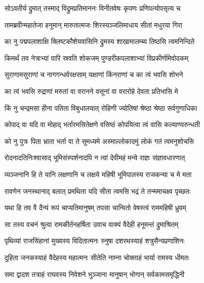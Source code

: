 
\twolineshloka
{सोऽवतीर्य द्रुमात् तस्माद् विद्रुमप्रतिमाननः}
{विनीतवेषः कृपणः प्रणिपत्योपसृत्य च} %

\twolineshloka
{तामब्रवीन्महातेजा हनूमान् मारुतात्मजः}
{शिरस्यञ्जलिमाधाय सीतां मधुरया गिरा} %

\twolineshloka
{का नु पद्मपलाशाक्षि क्लिष्टकौशेयवासिनि}
{द्रुमस्य शाखामालम्ब्य तिष्ठसि त्वमनिन्दिते} %

\twolineshloka
{किमर्थं तव नेत्राभ्यां वारि स्रवति शोकजम्}
{पुण्डरीकपलाशाभ्यां विप्रकीर्णमिवोदकम्} %

\twolineshloka
{सुराणामसुराणां च नागगन्धर्वरक्षसाम्}
{यक्षाणां किंनराणां च का त्वं भवसि शोभने} %

\twolineshloka
{का त्वं भवसि रुद्राणां मरुतां वा वरानने}
{वसूनां वा वरारोहे देवता प्रतिभासि मे} %

\twolineshloka
{किं नु चन्द्रमसा हीना पतिता विबुधालयात्}
{रोहिणी ज्योतिषां श्रेष्ठा श्रेष्ठा सर्वगुणाधिका} %

\twolineshloka
{कोपाद् वा यदि वा मोहाद् भर्तारमसितेक्षणे}
{वसिष्ठं कोपयित्वा त्वं वासि कल्याण्यरुन्धती} %

\twolineshloka
{को नु पुत्रः पिता भ्राता भर्ता वा ते सुमध्यमे}
{अस्माल्लोकादमुं लोकं गतं त्वमनुशोचसि} %

\twolineshloka
{रोदनादतिनिःश्वासाद् भूमिसंस्पर्शनादपि}
{न त्वां देवीमहं मन्ये राज्ञः संज्ञावधारणात्} %

\twolineshloka
{व्यञ्जनानि हि ते यानि लक्षणानि च लक्षये}
{महिषी भूमिपालस्य राजकन्या च मे मता} %

\twolineshloka
{रावणेन जनस्थानाद् बलात् प्रमथिता यदि}
{सीता त्वमसि भद्रं ते तन्ममाचक्ष्व पृच्छतः} %

\twolineshloka
{यथा हि तव वै दैन्यं रूपं चाप्यतिमानुषम्}
{तपसा चान्वितो वेषस्त्वं राममहिषी ध्रुवम्} %

\twolineshloka
{सा तस्य वचनं श्रुत्वा रामकीर्तनहर्षिता}
{उवाच वाक्यं वैदेही हनूमन्तं द्रुमाश्रितम्} %

\twolineshloka
{पृथिव्यां राजसिंहानां मुख्यस्य विदितात्मनः}
{स्नुषा दशरथस्याहं शत्रुसैन्यप्रणाशिनः} %

\twolineshloka
{दुहिता जनकस्याहं वैदेहस्य महात्मनः}
{सीतेति नाम्ना चोक्ताहं भार्या रामस्य धीमतः} %

\twolineshloka
{समा द्वादश तत्राहं राघवस्य निवेशने}
{भुञ्जाना मानुषान् भोगान् सर्वकामसमृद्धिनी} %

